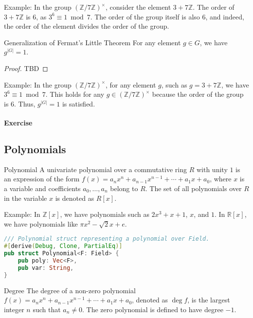 \documentclass{article}
\begin{document}
Example: In the group $(\mathbb{Z}/7\mathbb{Z})^{\times}$, consider the element $3 + 7\mathbb{Z}$. The order of $3 + 7\mathbb{Z}$ is 6, as $3^6 \equiv 1 \bmod 7$. The order of the group itself is also 6, and indeed, the order of the element divides the order of the group.

\begin{theorem}{Generalization of Fermat's Little Theorem}{} For any element $g \in G$, we have $g^{|G|} = 1$. \end{theorem}

\begin{proof}
    TBD
\end{proof}

Example: In the group $(\mathbb{Z}/7\mathbb{Z})^{\times}$, for any element $g$, such as $g = 3 + 7\mathbb{Z}$, we have $3^6 \equiv 1 \bmod 7$. This holds for any $g \in (\mathbb{Z}/7\mathbb{Z})^{\times}$ because the order of the group is 6. Thus, $g^{|G|} = 1$ is satisfied.

\paragraph{Exercise}

\subsection{Polynomials}

\begin{definition}{Polynomial}{}
    A univariate polynomial over a commutative ring $R$ with unity $1$ is an expression of the form $f(x) = a_n x^{n} + a_{n-1} x^{n-1} + \cdots + a_1 x + a_0$, where $x$ is a variable and coefficients $a_0, \ldots, a_n$ belong to $R$. The set of all polynomials over $R$ in the variable $x$ is denoted as $R[x]$.
\end{definition}

Example: In $\mathbb{Z}[x]$, we have polynomials such as $2x^3 + x + 1$, $x$, and $1$. In $\mathbb{R}[x]$, we have polynomials like $\pi x^2 - \sqrt{2}x + e$.

\begin{lstlisting}[language=Rust, caption=Polynomial]
/// Polynomial struct representing a polynomial over Field.
#[derive(Debug, Clone, PartialEq)]
pub struct Polynomial<F: Field> {
    pub poly: Vec<F>,
    pub var: String,
}
\end{lstlisting}


\begin{definition}{Degree}{}
    The degree of a non-zero polynomial $f(x) = a_n x^{n} + a_{n-1} x^{n-1} + \cdots + a_1 x + a_0$, denoted as $\deg f$, is the largest integer $n$ such that $a_n \neq 0$. The zero polynomial is defined to have degree $-1$.
\end{definition}
\end{document}
